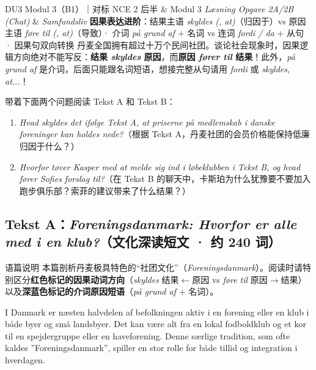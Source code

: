 {DU3 Modul 3（B1）｜对标 NCE 2 后半 \& Modul 3 \textit{Læsning Opgave 2A/2B (Chat)} \& \textit{Samfundsliv}}
{\textbf{因果表达进阶}：结果主语 \textit{skyldes (, at)}（归因于）vs 原因主语 \textit{føre til (, at)}（导致）· 介词 \textit{på grund af} + 名词 vs 连词 \textit{fordi / da} + 从句 · 因果句双向转换}
{丹麦全国拥有超过十万个民间社团。谈论社会现象时，因果逻辑方向绝对不能写反：\textbf{结果 \textit{skyldes} 原因}，而\textbf{原因 \textit{fører til} 结果}！此外，\textit{på grund af} 是介词，后面只能跟名词短语，想接完整从句请用 \textit{fordi} 或 \textit{skyldes, at...}！}

\begin{foerduleaeser}
带着下面两个问题阅读 Tekst A 和 Tekst B：
\begin{enumerate}
  \item \textit{Hvad skyldes det ifølge Tekst A, at priserne på medlemskab i danske foreninger kan holdes nede?}（根据 Tekst A，丹麦社团的会员价格能保持低廉归因于什么？）
  \item \textit{Hvorfor tøver Kasper med at melde sig ind i løbeklubben i Tekst B, og hvad fører Sofies forslag til?}（在 Tekst B 的聊天中，卡斯珀为什么犹豫要不要加入跑步俱乐部？索菲的建议带来了什么结果？）
\end{enumerate}
\end{foerduleaeser}


\subsection*{Tekst A：\textit{Foreningsdanmark: Hvorfor er alle med i en klub?}（文化深读短文 · 约 240 词）}

\begin{tipbox}{语篇说明}
本篇剖析丹麦极具特色的“社团文化”（\textit{Foreningsdanmark}）。阅读时请特别区分\textbf{\color{NCDRed}红色标记的因果动词方向}（\textit{skyldes} 结果$\leftarrow$原因 vs \textit{føre til} 原因$\rightarrow$结果）以及\textbf{\color{NCDNavy}深蓝色标记的介词原因短语}（\textit{på grund af} + 名词）。
\end{tipbox}

I Danmark er næsten halvdelen af befolkningen aktiv i en forening eller en klub i både byer og små landsbyer. Det kan være alt fra en lokal fodboldklub og et kor til en spejdergruppe eller en haveforening. Denne særlige tradition, som ofte kaldes ”Foreningsdanmark”, spiller en stor rolle for både tillid og integration i hverdagen.


